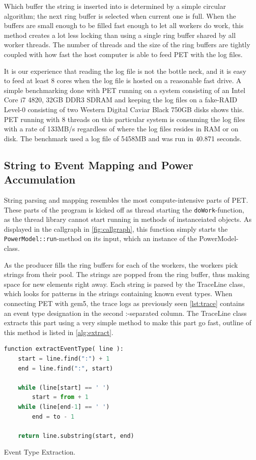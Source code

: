 Which buffer the string is inserted into is determined by a simple circular
algorithm; the next ring buffer is selected when current one is full. When the
buffers are small enough to be filled fast enough to let all workers do work,
this method creates a lot less locking than using a single ring buffer shared by
all worker threads. The number of threads and the size of the ring buffers are
tightly coupled with how fast the host computer is able to feed PET with the log
files.

It is our experience that reading the log file is not the bottle neck, and it is
easy to feed at least 8 cores when the log file is hosted on a reasonable fast
drive. A simple benchmarking done with PET running on a system consisting of an
Intel Core i7 4820, 32GB DDR3 SDRAM and keeping the log files on a fake-RAID
Level-0 consisting of two Western Digital Caviar Black 750GB disks shows this.
PET running with 8 threads on this particular system is consuming the log files
with a rate of 133MB/s regardless of where the log files resides in RAM or on
disk. The benchmark used a log file of 5458MB and was run in 40.871 seconds.

\subsection{String to Event Mapping and Power Accumulation}

String parsing and mapping resembles the most compute-intensive parts of PET.
These parts of the program is kicked off as thread starting the
\texttt{doWork}-function, as the thread library cannot start running in methods
of instanceiated objects. As displayed in the callgraph in
\autoref{fig:callgraph}, this function simply starts the
\texttt{PowerModel::run}-method on its input, which an instance of the
PowerModel-class.

As the producer fills the ring buffers for each of the workers, the workers pick
strings from their pool. The strings are popped from the ring buffer, thus
making space for new elements right away. Each string is parsed by the TraceLine
class, which looks for patterns in the strings containing known event types.
When connecting PET with gem5, the trace logs as previously seen
\autoref{lst:trace} contains an event type designation in the second :-separated
column. The TraceLine class extracts this part using a very simple method to
make this part go fast, outline of this method is listed in
\autoref{alg:extract}.

\begin{algorithm}
    \begin{lstlisting}[style=algo,language=python]
function extractEventType( line ):
    start = line.find(":") + 1
    end = line.find(":", start)

    while (line[start] == ' ')
        start = from + 1
    while (line[end-1] == ' ')
        end = to - 1

    return line.substring(start, end)
    \end{lstlisting}
    \caption{Event Type Extraction.}
    \label{alg:extract}
\end{algorithm}


